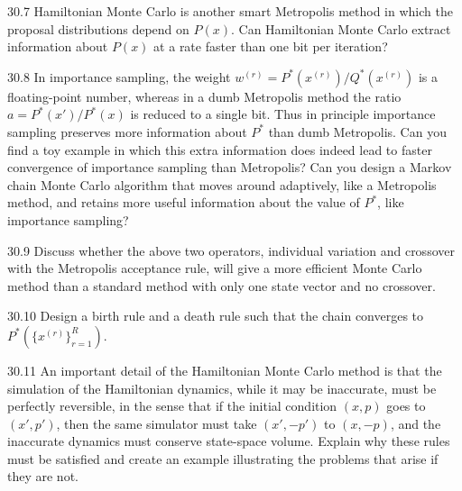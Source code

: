 \documentclass[12pt, a4paper]{article}
\begin{document}
\begin{prob}{30.7}
Hamiltonian Monte Carlo is another smart Metropolis method in which the proposal distributions depend on $P(x)$. Can Hamiltonian Monte Carlo extract information about $P(x)$ at a rate faster than one bit per iteration?
\end{prob}
\begin{sol}
\end{sol}
\bigskip

\begin{prob}{30.8}
In importance sampling, the weight $w^{(r)} = P^\ast(x^{(r)})/Q^\ast(x^{(r)})$ is a floating-point number, whereas in a dumb Metropolis method the ratio $a=P^\ast(x')/P^\ast(x)$ is reduced to a single bit. Thus in principle importance sampling preserves more information about $P^\ast$ than dumb Metropolis. Can you find a toy example in which this extra information does indeed lead to faster convergence of importance sampling than Metropolis? Can you design a Markov chain Monte Carlo algorithm that moves around adaptively, like a Metropolis method, and retains more useful information about the value of $P^\ast$, like importance sampling?
\end{prob}
\begin{sol}
\end{sol}
\bigskip

\begin{prob}{30.9}
Discuss whether the above two operators, individual variation and crossover with the Metropolis acceptance rule, will give a more efficient Monte Carlo method than a standard method with only one state vector and no crossover.
\end{prob}
\begin{sol}
\end{sol}
\bigskip

\begin{prob}{30.10}
Design a birth rule and a death rule such that the chain converges to $P^\ast(\{x^{(r)}\}_{r=1}^{R})$.
\end{prob}
\begin{sol}
\end{sol}
\bigskip

\begin{prob}{30.11}
An important detail of the Hamiltonian Monte Carlo method is that the simulation of the Hamiltonian dynamics, while it may be inaccurate, must be perfectly reversible, in the sense that if the initial condition $(x,p)$ goes to $(x',p')$, then the same simulator must take $(x',-p')$ to $(x,-p)$, and the inaccurate dynamics must conserve state-space volume. Explain why these rules must be satisfied and create an example illustrating the problems that arise if they are not.
\end{prob}
\begin{sol}
\end{sol}
\bigskip
\end{document}
